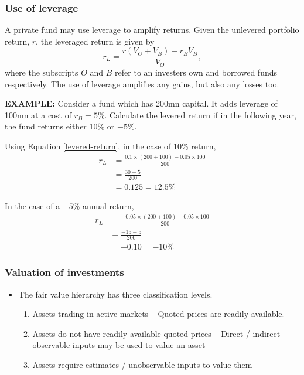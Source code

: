 \documentclass[../notes_compiled.tex]{subfiles}
\begin{document}
\subsubsection{Use of leverage}
\begin{itemize}
\item A private fund may use leverage to amplify returns. Given the unlevered portfolio return, $r$, the leveraged return is given by
\begin{equation}
r_{L} = \frac{r(V_{O} + V_{B})-r_{B}V_{B}}{V_{O}}, \label{levered-return}
\end{equation}
where the subscripts $O$ and $B$ refer to an investers own and borrowed funds respectively. The use of leverage amplifies any gains, but also any losses too.
{\color{RedViolet}
\item[] \textbf{EXAMPLE:} Consider a fund which has 200mn capital. It adds leverage of 100mn at a cost of $r_{B}=5\%$. Calculate the levered return if in the following year, the fund returns either 10\% or $-5\%$.
}
{\color{RoyalBlue}
\item[] Using Equation \ref{levered-return}, in the case of 10\% return,
\begin{align*}
r_{L} &= \frac{0.1\times(200 + 100) - 0.05 \times 100}{200} \\
&=\frac{30 -5}{200} \\
&=0.125=12.5\%
\end{align*}
\item[] In the case of a $-5\%$ annual return,
\begin{align*}
r_{L} &= \frac{-0.05\times(200 + 100) - 0.05 \times 100}{200} \\
&=\frac{-15-5}{200} \\
&= -0.10 = -10\%
\end{align*}
}
\end{itemize}

\subsubsection{Valuation of investments}
\begin{itemize}
\item The fair value hierarchy has three classification levels.
\begin{enumerate}
\item Assets trading in active markets -- Quoted prices are readily available.
\item Assets do not have readily-available quoted prices -- Direct / indirect observable inputs may be used to value an asset
\item Assets require estimates / unobservable inputs to value them
\end{enumerate}
\end{itemize}
\end{document}
